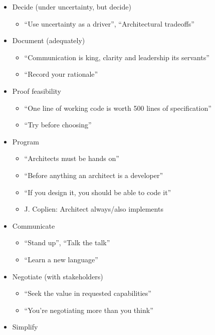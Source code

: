 \begin{itemize}
\tightlist
\item
  Decide (under uncertainty, but decide)

  \begin{itemize}
  \tightlist
  \item
    ``Use uncertainty as a driver'', ``Architectural tradeoffs''
  \end{itemize}
\item
  Document (adequately)

  \begin{itemize}
  \tightlist
  \item
    ``Communication is king, clarity and leadership its servants''
  \item
    ``Record your rationale''
  \end{itemize}
\item
  Proof feasibility

  \begin{itemize}
  \tightlist
  \item
    ``One line of working code is worth 500 lines of specification''
  \item
    ``Try before choosing''
  \end{itemize}
\item
  Program

  \begin{itemize}
  \tightlist
  \item
    ``Architects must be hands on''
  \item
    ``Before anything an architect is a developer''
  \item
    ``If you design it, you should be able to code it''
  \item
    J. Coplien: Architect always/also implements
  \end{itemize}
\item
  Communicate

  \begin{itemize}
  \tightlist
  \item
    ``Stand up'', ``Talk the talk''
  \item
    ``Learn a new language''
  \end{itemize}
\item
  Negotiate (with stakeholders)

  \begin{itemize}
  \tightlist
  \item
    ``Seek the value in requested capabilities''
  \item
    ``You're negotiating more than you think''
  \end{itemize}
\item
  Simplify


\end{itemize}
